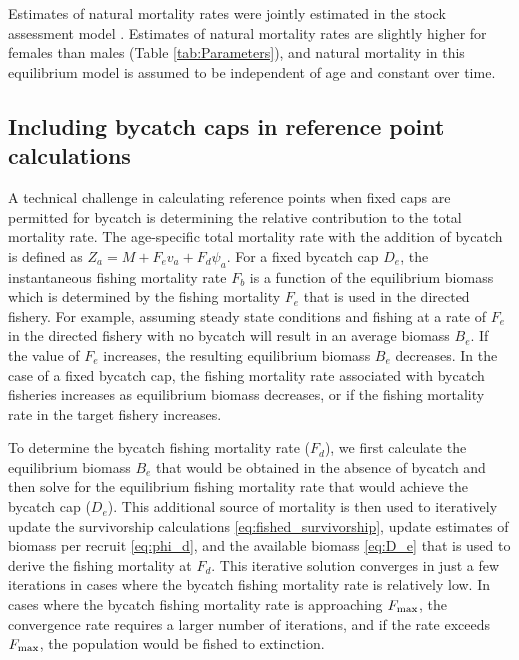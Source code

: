 \documentclass[12pt,leqno]{article}
\begin{document}
Estimates of natural mortality rates were jointly estimated in the stock assessment model \citep{stewartMartell2014}.  Estimates of natural mortality rates are slightly higher for females than males (Table \ref{tab:Parameters}), and natural mortality in this equilibrium model is assumed to be independent of age and constant over time.

\subsection*{Including bycatch caps in reference point calculations}
A technical challenge in calculating reference points when fixed caps are permitted for bycatch is determining the relative contribution to the total mortality rate.  The age-specific total mortality rate with the addition of bycatch is defined as $Z_a = M + F_e v_a + F_d \psi_a$.  For a fixed bycatch cap $D_e$, the instantaneous fishing mortality rate $F_b$ is a function of the equilibrium biomass which is determined by the fishing mortality $F_e$ that is used in the directed fishery.  For example, assuming steady state conditions and fishing at a rate of $F_e$ in the directed fishery with no bycatch will result in an average biomass $B_e$.  If the value of $F_e$ increases, the resulting equilibrium biomass $B_e$ decreases.  In the case of a fixed bycatch cap, the fishing mortality rate associated with bycatch fisheries increases as equilibrium biomass decreases, or if the fishing mortality rate in the target fishery increases.

To determine the bycatch fishing mortality rate ($F_d$), we first calculate the equilibrium biomass $B_e$ that would be obtained in the absence of bycatch and then solve for the equilibrium fishing mortality rate that would achieve the bycatch cap ($D_e$).  This additional source of mortality is then used to iteratively update the survivorship calculations \eqref{eq:fished_survivorship}, update estimates of biomass per recruit \eqref{eq:phi_d}, and the available biomass \eqref{eq:D_e} that is used to derive the fishing mortality at $F_d$.  This iterative solution converges in just a few iterations in cases where the bycatch fishing mortality rate is relatively low.  In cases where the bycatch fishing mortality rate is approaching $F_{\rm{max}}$, the convergence rate requires a larger number of iterations, and if the rate exceeds $F_{\rm{max}}$, the population would be fished to extinction.

%
%
\end{document}
